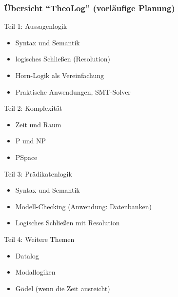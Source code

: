 \documentclass[aspectratio=1610,onlymath]{beamer}
\begin{document}
% 
% 
% 
% 

\begin{frame}\frametitle{Übersicht "`TheoLog"' (vorläufige Planung)}

\alert{Teil 1: Aussagenlogik}
\begin{itemize}
\item Syntax und Semantik
\item logisches Schließen (Resolution)
\item Horn-Logik als Vereinfachung
\item Praktische Anwendungen, SMT-Solver
\end{itemize}

\alert{Teil 2: Komplexität}
\begin{itemize}
\item Zeit und Raum
\item P und NP
\item PSpace
\end{itemize}

\alert{Teil 3: Prädikatenlogik}
\begin{itemize}
\item Syntax und Semantik
\item Modell-Checking (Anwendung: Datenbanken)
\item Logisches Schließen mit Resolution
\end{itemize}

\alert{Teil 4: Weitere Themen}
\begin{itemize}
\item Datalog
\item Modallogiken
\item Gödel (wenn die Zeit ausreicht)
\end{itemize}

\end{frame}
\end{document}

